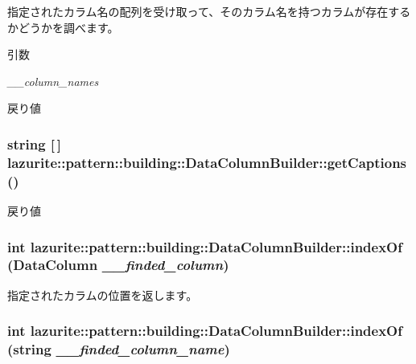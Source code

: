 指定されたカラム名の配列を受け取って、そのカラム名を持つカラムが存在するかどうかを調べます。 
\begin{DoxyParams}{引数}
\item[{\em \_\-\_\-column\_\-names}]\end{DoxyParams}
\begin{DoxyReturn}{戻り値}

\end{DoxyReturn}
\hypertarget{classlazurite_1_1pattern_1_1building_1_1_data_column_builder_aa307041bebf3d3dfacb4bd7e42d76fae}{
\subsubsection[{getCaptions}]{\setlength{\rightskip}{0pt plus 5cm}string \mbox{[}$\,$\mbox{]} lazurite::pattern::building::DataColumnBuilder::getCaptions ()}}
\label{classlazurite_1_1pattern_1_1building_1_1_data_column_builder_aa307041bebf3d3dfacb4bd7e42d76fae}
\begin{DoxyReturn}{戻り値}

\end{DoxyReturn}
\hypertarget{classlazurite_1_1pattern_1_1building_1_1_data_column_builder_a60652f948b08d6727518947a37cf593a}{
\subsubsection[{indexOf}]{\setlength{\rightskip}{0pt plus 5cm}int lazurite::pattern::building::DataColumnBuilder::indexOf (DataColumn {\em \_\-\_\-finded\_\-column})}}
\label{classlazurite_1_1pattern_1_1building_1_1_data_column_builder_a60652f948b08d6727518947a37cf593a}
指定されたカラムの位置を返します。 \hypertarget{classlazurite_1_1pattern_1_1building_1_1_data_column_builder_ad4698f066eb2b013b40307ec533a7a2d}{
\subsubsection[{indexOf}]{\setlength{\rightskip}{0pt plus 5cm}int lazurite::pattern::building::DataColumnBuilder::indexOf (string {\em \_\-\_\-finded\_\-column\_\-name})}}
